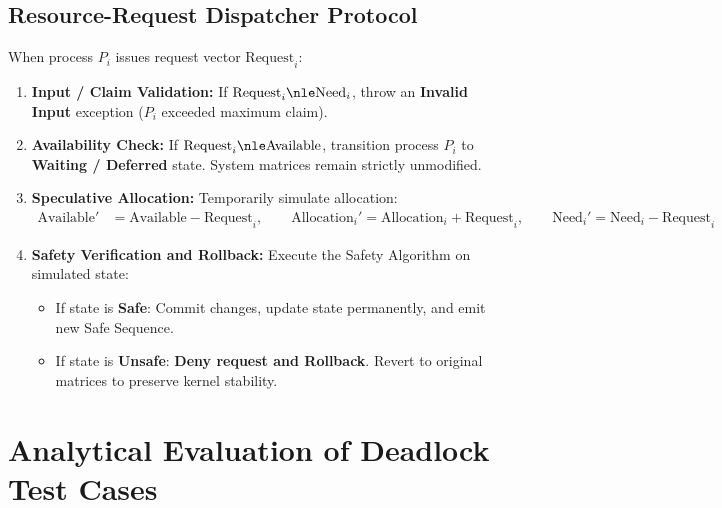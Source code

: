\documentclass[11pt,a4paper]{article}
\begin{document}
\subsection{Resource-Request Dispatcher Protocol}
When process $P_i$ issues request vector $\text{Request}_i$:
\begin{enumerate}[leftmargin=1.5em,noitemsep]
    \item \textbf{Input / Claim Validation:} If $\text{Request}_i \nle \text{Need}_i$, throw an \textbf{Invalid Input} exception ($P_i$ exceeded maximum claim).
    \item \textbf{Availability Check:} If $\text{Request}_i \nle \text{Available}$, transition process $P_i$ to \textbf{Waiting / Deferred} state. System matrices remain strictly unmodified.
    \item \textbf{Speculative Allocation:} Temporarily simulate allocation:
    \begin{align*}
        \text{Available}' &= \text{Available} - \text{Request}_i, \qquad
        \text{Allocation}_i' = \text{Allocation}_i + \text{Request}_i, \qquad
        \text{Need}_i' = \text{Need}_i - \text{Request}_i
    \end{align*}
    \item \textbf{Safety Verification and Rollback:} Execute the Safety Algorithm on simulated state:
    \begin{itemize}[noitemsep]
        \item If state is \textbf{Safe}: Commit changes, update state permanently, and emit new Safe Sequence.
        \item If state is \textbf{Unsafe}: \textbf{Deny request and Rollback}. Revert to original matrices to preserve kernel stability.
    \end{itemize}
\end{enumerate}

\section{Analytical Evaluation of Deadlock Test Cases}
\end{document}
